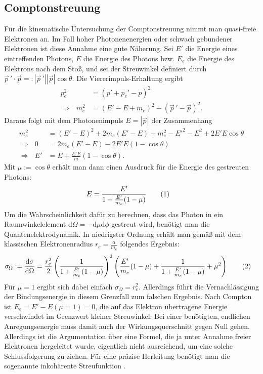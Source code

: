 \documentclass[german, parskip=full]{scrartcl}
\newcommand\numberthis{\addtocounter{equation}{1}\tag{\theequation}}
\newcommand{\kla}{}
\newcommand{\tecxt}{}
\begin{document}
\subsection{Comptonstreuung}
Für die kinematische Untersuchung der Comptonstreuung nimmt man quasi-freie Elektronen an. Im Fall hoher Photonenenergien oder schwach gebundener Elektronen ist diese Annahme eine gute Näherung. Sei $E'$ die Energie eines eintreffenden Photons, $E$ die Energie des Photons bzw. $E_e$ die Energie des Elektrons nach dem Stoß, und sei der Streuwinkel definiert durch $\vec{p}\,'\cdot\vec{p} =: |\vec{p}\,'||\vec{p}|\cos\theta$. Die Viererimpuls-Erhaltung ergibt
\begin{align*}
p_e^2&=\kla\left( {p'+p_e'-p} \right)^2\\
\Rightarrow\ \ \ m_e^2&=\kla\left( {E'-E+m_e} \right)^2-\kla\left( {\vec{p}\,'-\vec{p}} \right)^2.
\end{align*}
Daraus folgt mit dem Photonenimpuls $E=|\vec{p}|$ der Zusammenhang 
\begin{align*}
m_e^2&=(E'-E)^2+2m_e(E'-E)+m_e^2-E'^2 -E^2+2E'E\cos\theta\\
\Rightarrow\ \ \ 0&=2m_e(E'-E)-2E'E\kla\left( {1-\cos\theta} \right)\\
\Rightarrow\ \ \ E'&=E+\frac{E'E}{m}(1-\cos\theta).
\end{align*}
Mit $\mu:=\cos\theta$ erhält man dann einen Ausdruck für die Energie des gestreuten Photons:
\begin{align*}
E&=\frac{E'}{1+\frac{E'}{m_e}(1-\mu)} \numberthis\label{eqn:CS E of E prime and mu}
\end{align*}
Um die Wahrscheinlichkeit dafür zu berechnen, dass das Photon in ein Raumwinkelelement $\tecxt\text{d}\Omega=-\tecxt\text{d}\mu\tecxt\text{d}\phi$ gestreut wird, benötigt man die Quantenelektrodynamik. In niedrigster Ordnung erhält man gemäß \cite{Wiki Klein Nishina} mit dem klassischen Elektronenradius $r_e=\frac{\alpha}{m_e}$ folgendes Ergebnis:
\begin{align*}
\sigma_\Omega &:=\frac{\tecxt\text{d}\sigma}{\tecxt\text{d}\Omega}=\frac{r_e^2}{2}\kla\left( {\frac{1}{1+\frac{E'}{m_e}(1-\mu)}} \right)^2\kla\left( {\frac{E'}{m_e}(1-\mu)+\frac{1}{1+\frac{E'}{m_e}(1-\mu)} + \mu^2} \right)\numberthis\label{eqn:Klein Nishina}
\end{align*}
Für $\mu=1$ ergibt sich dabei einfach $\sigma_\Omega=r_e^2$. Allerdings führt die Vernachlässigung der Bindungsenergie in diesem Grenzfall zum falschen Ergebnis. Nach Compton ist $E_e=E'-E(\mu=1)=0$, die auf das Elektron übertragene Energie verschwindet im Grenzwert kleiner Streuwinkel. Bei einer benötigten, endlichen Anregungsenergie muss damit auch der Wirkungsquerschnitt gegen Null gehen.\\ 
Allerdings ist die Argumentation über eine Formel, die ja unter Annahme freier Elektronen hergeleitet wurde, eigentlich nicht ausreichend, um eine solche Schlussfolgerung zu ziehen. Für eine präzise Herleitung benötigt man die sogenannte inkohärente Streufunktion \cite{CS Anleitung}.
\end{document}
